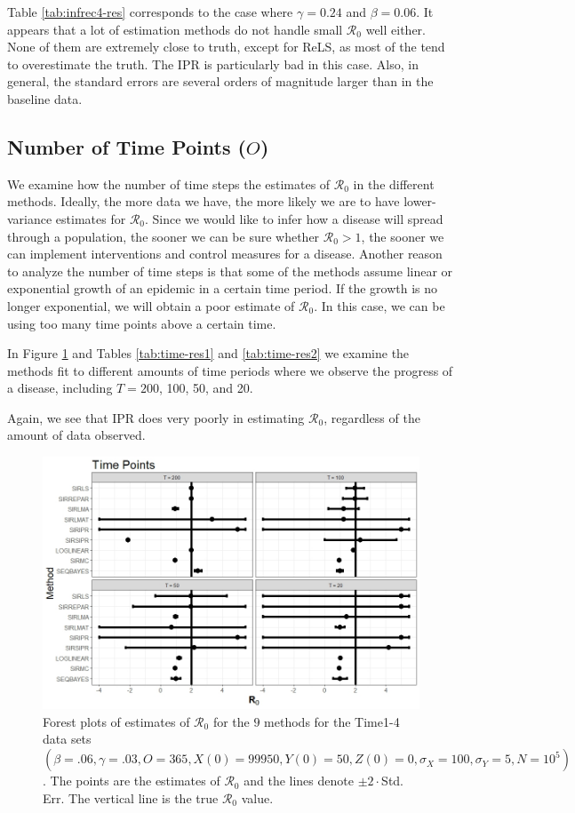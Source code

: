 \documentclass[12pt]{article}
\newcommand{\xxsir}{\ensuremath{9} } %
\newcommand{\rr}{\ensuremath{\mathcal{R}_0}}
\begin{document}
Table \ref{tab:infrec4-res} corresponds to the case where $\gamma = 0.24$ and $\beta=0.06$. It appears that a lot of estimation methods do not handle small $\rr$ well either. None of them are extremely close to truth, except for ReLS, as most of the tend to overestimate the truth. The IPR is particularly bad in this case. Also, in general, the standard errors are several orders of magnitude larger than in the baseline data.


\subsection{Number of Time Points ($O$)}\label{sec:res-time}
We examine how the number of time steps the estimates of $\rr$ in the different methods.  Ideally, the more data we have, the more likely we are to have lower-variance estimates for $\rr$.  Since we would like to  infer how a disease will spread through a population, the sooner we can be sure whether $\rr> 1$, the sooner we can implement interventions and control measures for a disease.  Another reason to analyze the number of time steps is that some of the methods assume linear or exponential growth of an epidemic in a certain time period.  If the growth is no longer exponential, we will obtain a poor estimate of $\rr$.  In this case, we can be using too many time points above a certain time.

In Figure \ref{fig:time-res} and Tables \ref{tab:time-res1} and \ref{tab:time-res2} we examine the methods fit to different amounts of time periods where we observe the progress of a disease, including $T=200$, 100, 50, and 20.

Again, we see that IPR does very poorly in estimating $\rr$, regardless of the amount of data observed.
\begin{figure}[H]
  \centering
  \includegraphics[scale=0.5]{images/time.jpeg}
  \caption{Forest plots of estimates of $\rr$ for the \xxsir methods for the Time1-4 data sets $(\beta=.06, \gamma=.03, O=365, X(0)=99950, Y(0)=50, Z(0)=0, \sigma_X=100, \sigma_Y=5, N=10^5)$.  The points are the estimates of $\rr$ and the lines denote $\pm 2\cdot $Std. Err.  The vertical line is the true $\rr$ value.}\label{fig:time-res}
  \end{figure}
\end{document}
